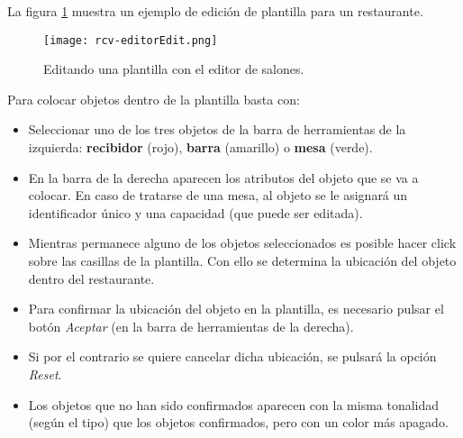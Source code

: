 La figura \ref{fig:rcv-editorEdit} muestra un ejemplo de edición de plantilla
para un restaurante.

  \begin{figure}[ht]
    \begin{center}
      \texttt{[image: rcv-editorEdit.png]}
      \caption{Editando una plantilla con el editor de salones.}
      \label{fig:rcv-editorEdit}
    \end{center}
  \end{figure}

Para colocar objetos dentro de la plantilla basta con:
\begin{itemize}
\item Seleccionar uno de los tres objetos de la barra de herramientas de la
izquierda: \textbf{recibidor} (rojo), \textbf{barra} (amarillo) o \textbf{mesa}
(verde).
\item En la barra de la derecha aparecen los atributos del objeto que se va a
colocar. En caso de tratarse de una mesa, al objeto se le asignará un 
identificador único y una capacidad (que puede ser editada).
\item Mientras permanece alguno de los objetos seleccionados es posible hacer
click sobre las casillas de la plantilla. Con ello se determina la ubicación
del objeto dentro del restaurante.
\item Para confirmar la ubicación del objeto en la plantilla, es necesario
pulsar el botón \emph{Aceptar} (en la barra de herramientas de la derecha).
\item Si por el contrario se quiere cancelar dicha ubicación, se pulsará la
opción \emph{Reset}.
\item Los objetos que no han sido confirmados aparecen con la misma tonalidad 
(según el tipo) que los objetos confirmados, pero con un color más apagado.
\end{itemize}

